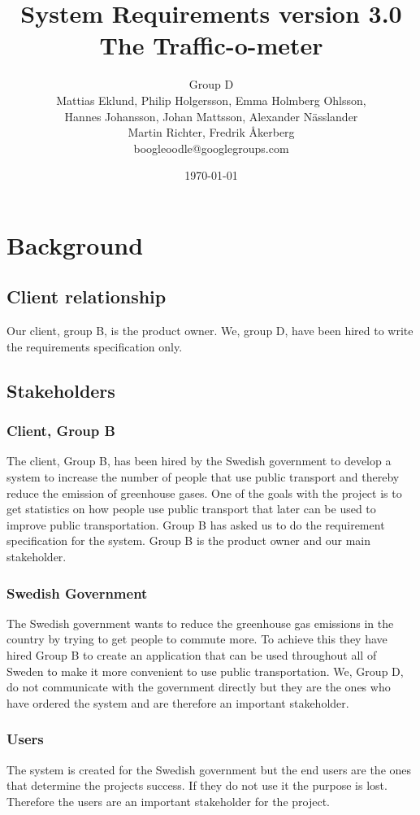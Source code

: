 \documentclass[a4paper]{article}
\title{System Requirements version 3.0\\ The Traffic-o-meter}
\author{Group D\\ Mattias Eklund, Philip Holgersson, Emma Holmberg Ohlsson,\\ Hannes Johansson, Johan Mattsson, Alexander Nässlander\\Martin Richter, Fredrik Åkerberg\\boogleoodle@googlegroups.com}
\date{\today}
\begin{document}
	\maketitle
	\thispagestyle{empty}
	\setcounter{page}{0}
	\pagebreak
	\tableofcontents
	\thispagestyle{empty}
	\pagebreak
	



	\section{Background} %
	\label{sec:background}
	
		\subsection{Client relationship}
	Our client, group B, is the product owner. We, group D, have been hired to write the requirements specification only.
		\subsection{Stakeholders} %
		\label{sub:stakeholders}
			\subsubsection{Client, Group B}
			The client, Group B, has been hired by the Swedish government to develop a system to increase the number of people that use public transport and thereby reduce the emission of greenhouse gases. One of the goals with the project is to get statistics on how people use public transport that later can be used to improve public transportation. Group B has asked us to do the requirement specification for the system. Group B is the product owner and our main stakeholder.

			\subsubsection{Swedish Government}
			The Swedish government wants to reduce the greenhouse gas emissions in the country by trying to get people to commute more. To achieve this they have hired Group B to create an application that can be used throughout all of Sweden to make it more convenient to use public transportation. We, Group D, do not  communicate with the government directly but they are the ones who have ordered the system and are therefore an important stakeholder. 

			\subsubsection{Users}
			The system is created for the Swedish government but the end users are the ones that determine the projects success. If they do not use it the purpose is lost. Therefore the users are an important stakeholder for the project.
\end{document}
